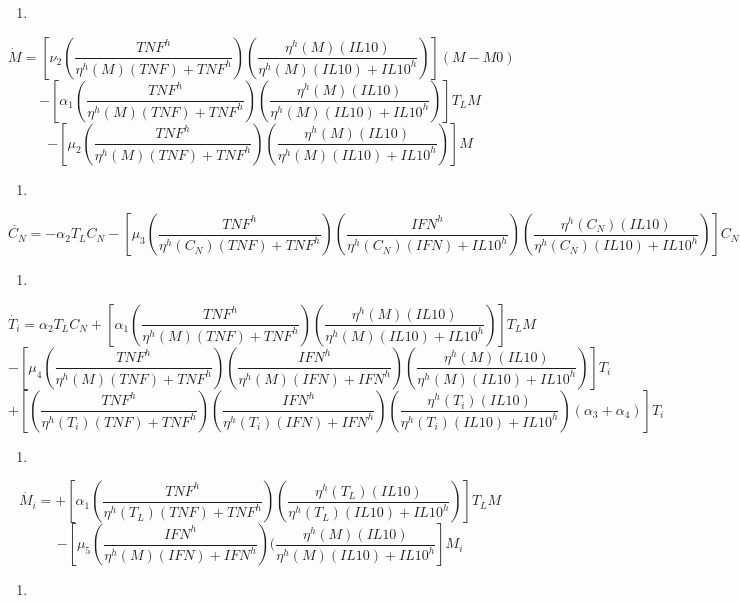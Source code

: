 \documentclass[
]{article}
\providecommand{\tightlist}{%
  \setlength{\itemsep}{0pt}\setlength{\parskip}{0pt}}
\begin{document}
\begin{enumerate}
\def\labelenumi{\arabic{enumi}.}
\setcounter{enumi}{1}
\tightlist
\item
\end{enumerate}

\[ \dot{M}= [\nu_{2}(\dfrac{TNF^{h}}{\eta^{h}(M)(TNF)+TNF^{h}})(\dfrac{\eta^{h}(M)(IL10)}{\eta^{h}(M)(IL10)+IL10^{h}})](M-M0)\]
\[-[\alpha_{1}(\dfrac{TNF^{h}}{\eta^{h}(M)(TNF)+ TNF^{h}})(\dfrac{\eta^{h}(M)(IL10)}{\eta^{h}(M)(IL10)+IL10^{h}})]T_{L}M\]
\[-[\mu_{2}(\dfrac{TNF^{h}}{\eta^{h}(M)(TNF)+TNF^{h}})(\dfrac{\eta^{h}(M)(IL10)}{\eta^{h}(M)(IL10)+IL10^{h}})]M  \]

\begin{enumerate}
\def\labelenumi{\arabic{enumi}.}
\setcounter{enumi}{2}
\tightlist
\item
\end{enumerate}

\[ \dot{C_{N}}= -\alpha_{2}T_{L}C_{N}-[\mu_{3}(\dfrac{TNF^{h}}{\eta^{h}(C_{N})(TNF)+TNF^{h}})(\dfrac{IFN^{h}}{\eta^{h}(C_{N})(IFN)+IL10^{h}})(\dfrac{\eta^{h}(C_{N})(IL10)}{\eta^{h}(C_{N})(IL10)+IL10^{h}})]C_{N} \]

\begin{enumerate}
\def\labelenumi{\arabic{enumi}.}
\setcounter{enumi}{3}
\tightlist
\item
\end{enumerate}

\[ \dot{T_{i}}=\alpha_{2}T_{L}C_{N}+[\alpha_{1}(\dfrac{TNF^{h}}{\eta^{h}(M)(TNF)+ TNF^{h}})(\dfrac{\eta^{h}(M)(IL10)}{\eta^{h}(M)(IL10)+IL10^{h}})]T_{L}M  \]
\[-[\mu_{4}(\dfrac{TNF^{h}}{\eta^{h}(M)(TNF)+TNF^{h}})(\dfrac{IFN^{h}}{\eta^{h}(M)(IFN)+IFN^{h}})(\dfrac{\eta^{h}(M)(IL10)}{\eta^{h}(M)(IL10)+IL10^{h}})]T_{i} \]
\[+[(\dfrac{TNF^{h}}{\eta^{h}(T_{i})(TNF)+TNF^{h}})(\dfrac{IFN^{h}}{\eta^{h}(T_{i})(IFN)+IFN^{h}})(\dfrac{\eta^{h}(T_{i})(IL10)}{\eta^{h}(T_{i})(IL10)+IL10^{h}})(\alpha_{3}+\alpha_{4})]T_{i}  \]

\begin{enumerate}
\def\labelenumi{\arabic{enumi}.}
\setcounter{enumi}{4}
\tightlist
\item
\end{enumerate}

\[ \dot{M_{i}}= +[\alpha_{1}(\dfrac{TNF^{h}}{\eta^{h}(T_{L})(TNF)+TNF^{h}})(\dfrac{\eta^{h}(T_{L})(IL10)}{\eta^{h}(T_{L})(IL10)+IL10^{h}})]T_{L}M   \]
\[-[\mu_{5}(\dfrac{IFN^{h}}{\eta^{h}(M)(IFN)+IFN^{h}})(\dfrac{\eta^{h}(M)(IL10)}{\eta^{h}(M)(IL10)+IL10^{h}}]M_{i}  \]

\begin{enumerate}
\def\labelenumi{\arabic{enumi}.}
\setcounter{enumi}{5}
\tightlist
\item
\end{enumerate}
\end{document}
